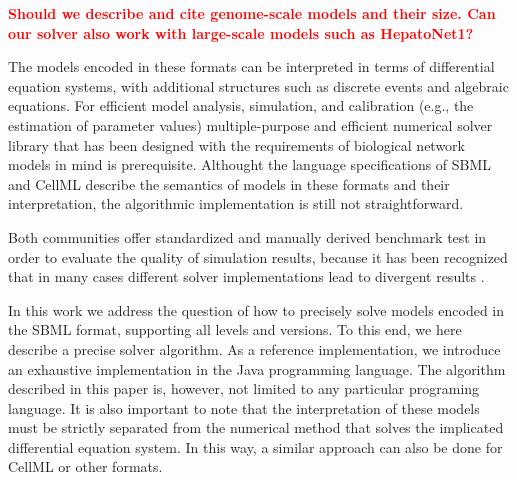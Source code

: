 \documentclass[10pt]{bmc_article}
\newenvironment{bmcformat}{\baselineskip20pt\sloppy\setboolean{publ}{false}}{\baselineskip20pt\sloppy}
\newcommand{\TODO}[1]{\textcolor{red}{\textbf{#1}}}
\begin{document}
\begin{bmcformat}
\TODO{Should we describe and cite genome-scale models and their size. Can our solver also
work with large-scale models such as HepatoNet1?}

The models encoded in these formats can be interpreted in terms of differential
equation systems, with additional structures such as discrete events and
algebraic equations. 
For efficient model analysis, simulation, and calibration (e.g.,
the estimation of parameter values) multiple-purpose and efficient numerical
solver library that has been designed with the requirements of biological
network models in mind is prerequisite.
Althought the language specifications of SBML \cite{Hucka2001, Hucka2003,
Finney2003a, Finney2006, Hucka2007, Hucka2008, Hucka2010a} 
and CellML \cite{Cuellar2006} describe the semantics of models in these formats
and their interpretation, the algorithmic implementation is still not
straightforward.

Both communities offer standardized and manually derived benchmark test in order
to evaluate the quality of simulation results, because it has been recognized that in many cases
different solver implementations lead to divergent results \cite{Bergmann2008}.

In this work we address the question of how to precisely solve models encoded in
the SBML format, supporting all levels and versions. To this end, we here
describe a precise solver algorithm. As a reference implementation, we
introduce an exhaustive implementation in the Java\texttrademark{} programming
language. The algorithm described in this paper is, however, not limited to any
particular programing language. It is also important to note that the
interpretation of these models must be strictly separated from the numerical
method that solves the implicated differential equation system. In this way, a
similar approach can also be done for CellML or other formats.


\end{bmcformat}
\end{document}
